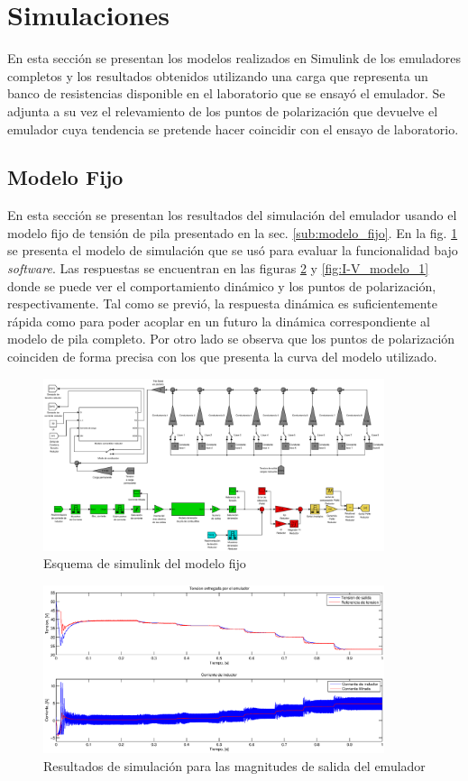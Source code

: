\section{Simulaciones}
En esta sección se presentan los modelos realizados en Simulink de los emuladores completos y los resultados obtenidos utilizando una
carga que representa un banco de resistencias disponible en el laboratorio que se ensayó el emulador. Se adjunta a su vez el relevamiento de los puntos de polarización 
que devuelve el emulador cuya tendencia se pretende hacer coincidir con el ensayo de laboratorio.

\subsection{Modelo Fijo}
En esta sección se presentan los resultados del simulación del emulador usando el modelo fijo de tensión de pila presentado en la sec. \ref{sub:modelo_fijo}. 
En la fig. \ref{fig:modelo_emulador_1} se presenta el modelo de simulación que se usó para evaluar la funcionalidad bajo \emph{software}.
Las respuestas se encuentran en las figuras \ref{fig:respuesta_emulador_1} y \ref{fig:I-V_modelo_1} donde se puede ver el comportamiento dinámico y los puntos
de polarización, respectivamente. Tal como se previó, la respuesta dinámica es suficientemente rápida como para poder acoplar en un futuro la dinámica correspondiente
al modelo de pila completo. Por otro lado se observa que los puntos de polarización coinciden de forma precisa con los que presenta la curva del modelo utilizado.

\begin{figure}[H]
\centering\includegraphics[width=10cm]{gfx/modelo_emulador_1.eps}
\caption{Esquema de simulink del modelo fijo}
\label{fig:modelo_emulador_1}
\end{figure}

\begin{figure}[H]
\centering
\includegraphics[width=10cm]{gfx/respuesta_emulador_1.eps}
\caption{Resultados de simulación para las magnitudes de salida del emulador}
\label{fig:respuesta_emulador_1}
\end{figure}

